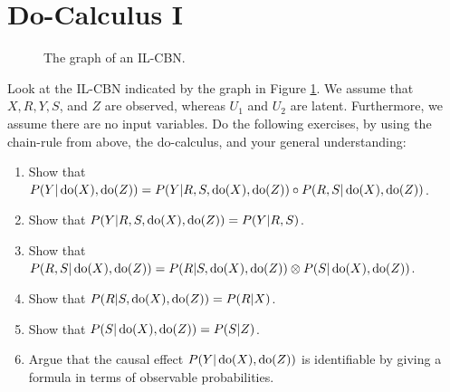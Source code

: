 \documentclass[11pt,a4paper]{article}
\begin{document}
\section{Do-Calculus I}
\begin{figure}[ht]
  \centering
  \caption{The graph of an IL-CBN.}\label{fig:my_fig}
  \end{figure}

Look at the IL-CBN indicated by the graph in Figure \ref{fig:my_fig}.
We assume that $X, R, Y, S$, and $Z$ are observed, whereas $U_1$ and $U_2$ are latent.
Furthermore, we assume there are no input variables.
Do the following exercises, by using the chain-rule from above, the do-calculus, and your general understanding:
\begin{enumerate}
  \item Show that $P(Y |  \operatorname{do}(X), \operatorname{do}(Z)) = P(Y | R, S, \operatorname{do}(X), \operatorname{do}(Z)) \circ P(R, S | \operatorname{do}(X), \operatorname{do}(Z))$. 
  \item Show that $P(Y | R, S, \operatorname{do}(X), \operatorname{do}(Z)) = P(Y | R, S)$. 
  \item Show that $P(R , S| \operatorname{do}(X), \operatorname{do}(Z)) = P(R | S, \operatorname{do}(X), \operatorname{do}(Z)) \otimes P(S | \operatorname{do}(X), \operatorname{do}(Z))$.
  \item Show that $P(R | S, \operatorname{do}(X), \operatorname{do}(Z)) = P(R | X)$.
  \item Show that $P(S | \operatorname{do}(X), \operatorname{do}(Z)) =  P(S | Z)$.
  \item Argue that the causal effect $P(Y | \operatorname{do}(X), \operatorname{do}(Z))$ is identifiable by giving a formula in terms of observable probabilities.
\end{enumerate}
\end{document}
